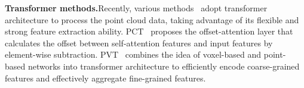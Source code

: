 \documentclass[preprint,12pt]{elsarticle}
\begin{document}
\begin{comment}
	\medskip	
	\noindent\textbf{Graph convolution methods}\hspace{0.3cm}Graph-based networks construct a graph from the point cloud according to spatial neighbors for each point. Feature learning on the graph can be performed in spatial or spectral domains. In the spatial domain, convolution is generally defined with MLP and graph information for each point is aggregated by pooling operation upon features of its neighbors~\cite{simonovsky2017dynamic}. DGCNN~\cite{wang2019dynamic} progressively updates the graph in feature space after the edge convolution layer composed of MLP and pooling operation. DPAM~\cite{liu2019dynamic} takes points similarity graph as input for a graph convolution network and learns the agglomeration matrix that is multiplied with the points feature matrix. Alternatively, graph-based networks in the spectral domain exploit spectral filtering to define convolution. RGCNN~\cite{te2018rgcnn} updates the graph Laplacian matrix in each layer based on  Chebyshev polynomial approximation. LocalSpecGCN~\cite{wang2018local} applies spectral graph convolution on a local graph for nearest neighbors of each point to learn relative layout. Although these graph-based networks have strong capability to handle irregular data, graph should be constructed in advance and the connectivity patterns of the graph are often complicated.
\end{comment}

\medskip	
\noindent\textbf{Transformer methods.}\hspace{0.3cm}Recently, various methods~\cite{guo2021pct, zhang2022pvt, zhang2022patchformer} adopt transformer architecture to process the point cloud data, taking advantage of its flexible and strong feature extraction ability. PCT~\cite{guo2021pct} proposes the offset-attention layer that calculates the offset between self-attention features and input features by element-wise subtraction. PVT~\cite{zhang2022pvt} combines the idea of voxel-based and point-based networks into transformer architecture to efficiently encode coarse-grained features and effectively aggregate fine-grained features.
\end{document}
